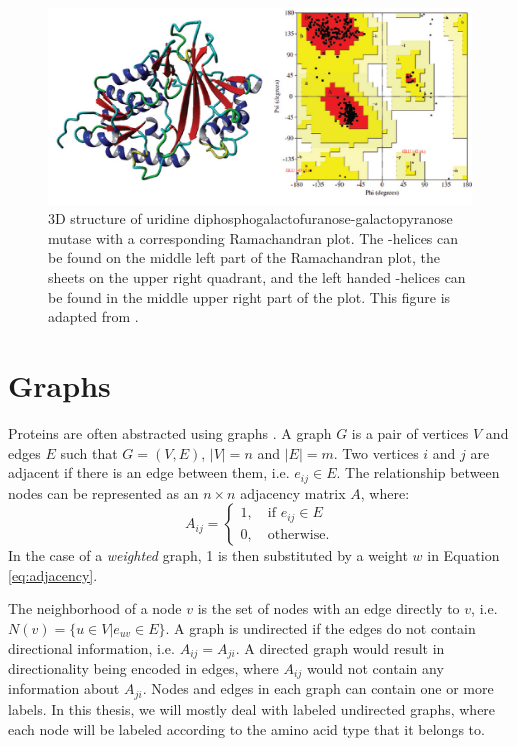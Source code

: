 \begin{figure}[h!]
  \centering
  \includegraphics[width=.7\textwidth]{./figures/ramachandran_plot.jpg}
  \caption[3D structure of uridine diphosphogalactofuranose-galactopyranose
  mutase with a corresponding Ramachandran plot.]{3D structure of uridine diphosphogalactofuranose-galactopyranose
mutase with a corresponding Ramachandran plot. The \textalpha{}-helices can be
found on the middle left part of the Ramachandran plot, the \textbeta{} sheets on
the upper right quadrant, and the left handed \textalpha{}-helices can be found in
the middle upper right part of the plot. This figure is adapted from
\cite{nayak2018identification}.}
  \label{fig:ramachandran}
\end{figure}

\section{Graphs}\label{sec:graphs}

Proteins are often abstracted using graphs
\citep{anand2018generative,ingraham2019generative}. A graph $G$ is a pair of
vertices $V$ and edges $E$ such that $G=(V, E)$, $|V|=n$ and $|E|=m$. Two
vertices $i$ and $j$ are adjacent if there is an edge between them, i.e.
$e_{ij}\in E$. The relationship between nodes can be represented as an $n\times
n$ adjacency matrix $A$, where:
\begin{equation}
  \label{eq:adjacency}
  A_{ij}=\begin{cases}
    1, \quad\text{if } e_{ij}\in E\\
    0, \quad\text{otherwise.}
  \end{cases}
\end{equation}
In the case of a \emph{weighted} graph, 1 is then substituted by a weight $w$ in
Equation \ref{eq:adjacency}.

The neighborhood of a node $v$ is the set of nodes with an edge directly to $v$,
i.e. $N(v) = \{ u\in V|e_{uv} \in E \}$. A graph is undirected if the edges do
not contain directional information, i.e. $A_{ij}=A_{ji}$. A directed graph
would result in directionality being encoded in edges, where $A_{ij}$ would not
contain any information about $A_{ji}$. Nodes and edges in each graph can
contain one or more labels. In this thesis, we will mostly deal with labeled
undirected graphs, where each node will be labeled according to the amino acid
type that it belongs to.

